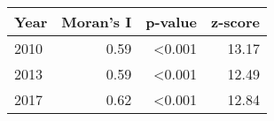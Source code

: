 \begin{tabular}{l r r r}
\toprule
Year & Moran's I & p-value & z-score \\
\midrule
2010  &  0.59  &  \textless{}0.001  &  13.17 \\
2013  &  0.59  &  \textless{}0.001  &  12.49 \\
2017  &  0.62  &  \textless{}0.001  &  12.84 \\
\bottomrule
\end{tabular}
